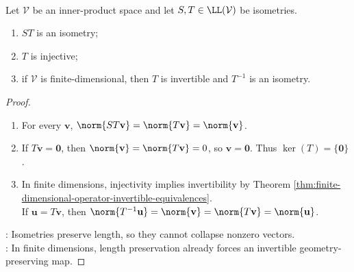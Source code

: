 \begin{proposition} \label{prop:basic-isometry-properties} \\
Let $\mathcal{V}$ be an inner-product space and let $S,T\in\LL(\mathcal{V})$ be isometries.
\begin{enumerate}[label=\roman*.]
\setlength{\itemsep}{0pt}
\item $ST$ is an isometry;
\item $T$ is injective;
\item if $\mathcal{V}$ is finite-dimensional, then $T$ is invertible and $T^{-1}$ is an isometry.
\end{enumerate}
\begin{proof}
\begin{enumerate}[label=(\roman*)]
\setlength{\itemsep}{0pt}
\item For every $\mathbf{v}$, $\norm{ST\mathbf{v}}=\norm{T\mathbf{v}}=\norm{\mathbf{v}}$.
\item If $T\mathbf{v}=\mathbf{0}$, then $\norm{\mathbf{v}}=\norm{T\mathbf{v}}=0$, so $\mathbf{v}=\mathbf{0}$. Thus $\ker(T)=\{\mathbf{0}\}$.
\item In finite dimensions, injectivity implies invertibility by Theorem \ref{thm:finite-dimensional-operator-invertible-equivalences}.\\
If $\mathbf{u}=T\mathbf{v}$, then $\norm{T^{-1}\mathbf{u}}=\norm{\mathbf{v}}=\norm{T\mathbf{v}}=\norm{\mathbf{u}}$.
\end{enumerate}
: Isometries preserve length, so they cannot collapse nonzero vectors.\\
: In finite dimensions, length preservation already forces an invertible geometry-preserving map.
\end{proof}
\end{proposition}

